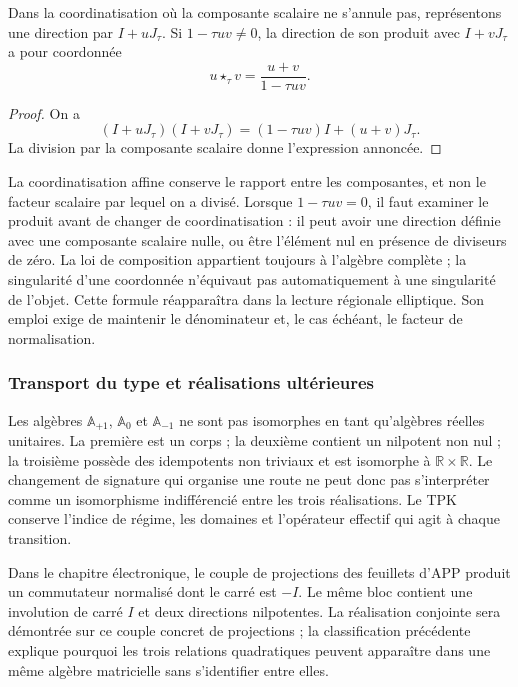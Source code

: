\begin{proposition}
\label{trit-ampl-prop-pendientes}
Dans la coordinatisation où la composante scalaire ne s'annule pas, représentons une
direction par \(I+uJ_\tau\). Si \(1-\tau uv\ne0\), la direction de son
produit avec \(I+vJ_\tau\) a pour coordonnée
\[
 u\star_\tau v=\frac{u+v}{1-\tau uv}.
\]
\end{proposition}
\begin{proof}
On a
\[
 (I+uJ_\tau)(I+vJ_\tau)
   =(1-\tau uv)I+(u+v)J_\tau.
\]
La division par la composante scalaire donne l'expression annoncée.
\end{proof}

La coordinatisation affine conserve le rapport entre les composantes, et non le facteur scalaire
par lequel on a divisé. Lorsque \(1-\tau uv=0\), il faut examiner le produit avant de
changer de coordinatisation : il peut avoir une direction définie avec une composante scalaire
nulle, ou être l'élément nul en présence de diviseurs de zéro. La loi de
composition appartient toujours à l'algèbre complète ; la singularité d'une
coordonnée n'équivaut pas automatiquement à une singularité de l'objet.
Cette formule réapparaîtra dans la lecture régionale elliptique. Son emploi exige
de maintenir le dénominateur et, le cas échéant, le facteur de normalisation.

\subsubsection{Transport du type et réalisations ultérieures}
\label{trit-ampl-puentes}

Les algèbres \(\mathbb A_{+1}\), \(\mathbb A_0\) et
\(\mathbb A_{-1}\) ne sont pas isomorphes en tant qu'algèbres réelles unitaires.
La première est un corps ; la deuxième contient un nilpotent non nul ; la
troisième possède des idempotents non triviaux et est isomorphe à
\(\mathbb R\times\mathbb R\). Le changement de signature qui organise une
route ne peut donc pas s'interpréter comme un isomorphisme indifférencié entre les
trois réalisations. Le TPK conserve l'indice de régime, les domaines et
l'opérateur effectif qui agit à chaque transition.

Dans le chapitre électronique, le couple de projections des feuillets d'APP
produit un commutateur normalisé dont le carré est \(-I\). Le même bloc
contient une involution de carré \(I\) et deux directions nilpotentes. La
réalisation conjointe sera démontrée sur ce couple concret de projections ;
la classification précédente explique pourquoi les trois relations quadratiques
peuvent apparaître dans une même algèbre matricielle sans s'identifier entre elles.

